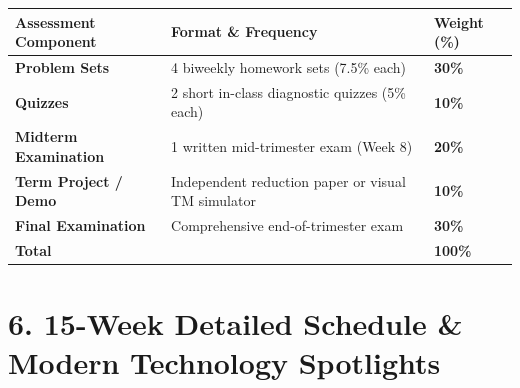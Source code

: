 \documentclass[11pt,a4paper]{article}
\begin{document}
\vspace{4pt}
\begin{center}
\begin{tabularx}{\textwidth}{X L{6.0cm} C{2.5cm}}
    \toprule
    \textbf{Assessment Component} & \textbf{Format \& Frequency} & \textbf{Weight (\%)} \\
    \midrule
    \textbf{Problem Sets} & 4 biweekly homework sets (7.5\% each) & \textbf{30\%} \\
    \textbf{Quizzes} & 2 short in-class diagnostic quizzes (5\% each) & \textbf{10\%} \\
    \textbf{Midterm Examination} & 1 written mid-trimester exam (Week 8) & \textbf{20\%} \\
    \textbf{Term Project / Demo} & Independent reduction paper or visual TM simulator & \textbf{10\%} \\
    \textbf{Final Examination} & Comprehensive end-of-trimester exam & \textbf{30\%} \\
    \bottomrule
    \textbf{Total} & & \textbf{100\%} \\
    \bottomrule
\end{tabularx}
\end{center}

\section*{6. 15-Week Detailed Schedule \& Modern Technology Spotlights}
\end{document}
